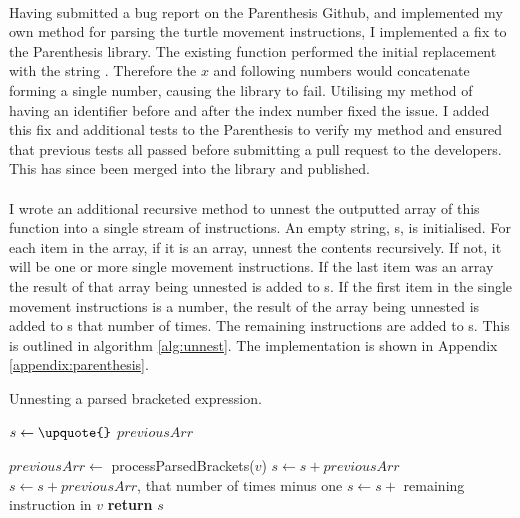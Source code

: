 \paragraph{} Having submitted a bug report on the Parenthesis Github, and implemented my own method for parsing the turtle movement instructions, I implemented a fix to the Parenthesis library. The existing function performed the initial replacement with the string . Therefore the $x$ and following numbers would concatenate forming a single number, causing the library to fail. Utilising my method of having an identifier before and after the index number fixed the issue. I added this fix and additional tests to the Parenthesis to verify my method and ensured that previous tests all passed before submitting a pull request to the developers. This has since been merged into the library and published.

\paragraph{} I wrote an additional recursive method to unnest the outputted array of this function into a single stream of instructions. An empty string, s, is initialised. For each item in the array, if it is an array, unnest the contents recursively. If not, it will be one or more single movement instructions. If the last item was an array the result of that array being unnested is added to s. If the first item in the single movement instructions is a number, the result of the array being unnested is added to s that number of times. The remaining instructions are added to s. This is outlined in algorithm \ref{alg:unnest}. The implementation is shown in Appendix \ref{appendix:parenthesis}.

\begin{algorithm}[!htbp]
\caption{Unnesting a parsed bracketed expression.}
\label{alg:unnest}
\begin{algorithmic}[1]

   \State $s\gets \texttt{\upquote{}}$
   \State $previousArr$

     \State $previousArr \gets$ processParsedBrackets($v$)
    \Else
        \State $s \gets s + previousArr$
          \State $s \gets s + previousArr$, that number of times minus one
        \EndIf
       \EndIf
       \State $s \gets s + $ remaining instruction in $v$
    \EndIf
   \EndFor
   \State \textbf{return} $s$

\EndProcedure
\end{algorithmic}
\end{algorithm}

